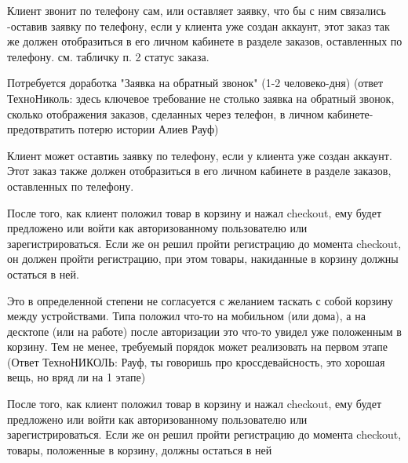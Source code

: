 {

\begin{wiki}
Клиент звонит по телефону сам, или оставляет заявку, что бы с ним связались -оставив заявку по телефону, если у клиента уже создан аккаунт, этот заказ так же должен отобразиться в его личном кабинете в разделе заказов, оставленных по телефону. см. табличку п. 2 статус заказа.
\end{wiki}

\begin{teamidea}
Потребуется доработка "Заявка на обратный звонок" (1-2 человеко-дня)
(ответ ТехноНиколь: здесь ключевое требование не столько заявка на обратный звонок, сколько отображения заказов, сделанных через телефон, в личном кабинете-предотвратить потерю истории Алиев Рауф)
\end{teamidea}


\begin{itogo}
Клиент может оставтиь заявку по телефону, если у клиента уже создан аккаунт. Этот заказ также должен отобразиться в его личном кабинете в разделе заказов, оставленных по телефону.
\end{itogo}

}

{


\begin{wiki}
После того, как клиент положил товар в корзину и нажал checkout, ему будет предложено или войти как авторизованному пользователю или зарегистрироваться. Если же он решил пройти регистрацию до момента checkout, он должен пройти регистрацию, при этом товары, накиданные в корзину должны остаться в ней. 
\end{wiki}

\begin{teamidea}
Это в определенной степени не согласуется с желанием таскать с собой корзину между устройствами. Типа положил что-то на мобильном (или дома), а на десктопе (или на работе) после авторизации это что-то увидел уже положенным в корзину. Тем не менее, требуемый порядок может реализовать на первом этапе
(Ответ ТехноНИКОЛЬ: Рауф, ты говоришь про кроссдевайсность, это хорошая вещь, но вряд ли на 1 этапе)
\end{teamidea}


\begin{itogo}
После того, как клиент положил товар в корзину и нажал checkout, ему будет предложено или войти как авторизованному пользователю или зарегистрироваться. Если же он решил пройти регистрацию до момента checkout, товары, положенные в корзину, должны остаться в ней
\end{itogo}
}

